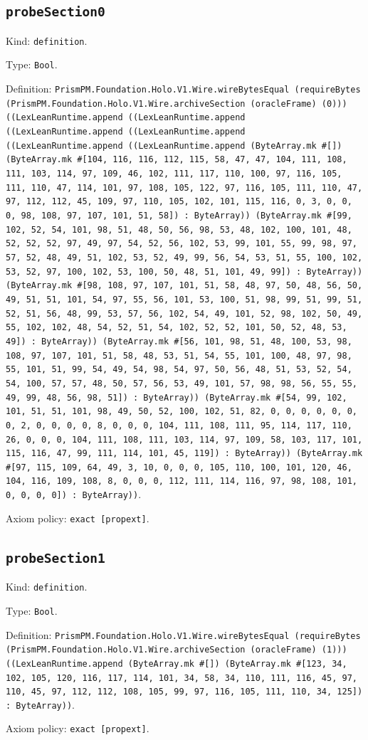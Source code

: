 \documentclass[11pt]{article}
\begin{document}
\subsection*{\texttt{probeSection0}}
\noindent Kind: \texttt{definition}.\par
\noindent Type: \texttt{Bool}.\par
\noindent Definition: \texttt{PrismPM.Foundation.Holo.V1.Wire.wireBytesEqual (requireBytes (PrismPM.Foundation.Holo.V1.Wire.archiveSection (oracleFrame) (0))) ((LexLeanRuntime.append ((LexLeanRuntime.append ((LexLeanRuntime.append ((LexLeanRuntime.append ((LexLeanRuntime.append ((LexLeanRuntime.append (ByteArray.mk \#[]) (ByteArray.mk \#[104, 116, 116, 112, 115, 58, 47, 47, 104, 111, 108, 111, 103, 114, 97, 109, 46, 102, 111, 117, 110, 100, 97, 116, 105, 111, 110, 47, 114, 101, 97, 108, 105, 122, 97, 116, 105, 111, 110, 47, 97, 112, 112, 45, 109, 97, 110, 105, 102, 101, 115, 116, 0, 3, 0, 0, 0, 98, 108, 97, 107, 101, 51, 58]) : ByteArray)) (ByteArray.mk \#[99, 102, 52, 54, 101, 98, 51, 48, 50, 56, 98, 53, 48, 102, 100, 101, 48, 52, 52, 52, 97, 49, 97, 54, 52, 56, 102, 53, 99, 101, 55, 99, 98, 97, 57, 52, 48, 49, 51, 102, 53, 52, 49, 99, 56, 54, 53, 51, 55, 100, 102, 53, 52, 97, 100, 102, 53, 100, 50, 48, 51, 101, 49, 99]) : ByteArray)) (ByteArray.mk \#[98, 108, 97, 107, 101, 51, 58, 48, 97, 50, 48, 56, 50, 49, 51, 51, 101, 54, 97, 55, 56, 101, 53, 100, 51, 98, 99, 51, 99, 51, 52, 51, 56, 48, 99, 53, 57, 56, 102, 54, 49, 101, 52, 98, 102, 50, 49, 55, 102, 102, 48, 54, 52, 51, 54, 102, 52, 52, 101, 50, 52, 48, 53, 49]) : ByteArray)) (ByteArray.mk \#[56, 101, 98, 51, 48, 100, 53, 98, 108, 97, 107, 101, 51, 58, 48, 53, 51, 54, 55, 101, 100, 48, 97, 98, 55, 101, 51, 99, 54, 49, 54, 98, 54, 97, 50, 56, 48, 51, 53, 52, 54, 54, 100, 57, 57, 48, 50, 57, 56, 53, 49, 101, 57, 98, 98, 56, 55, 55, 49, 99, 48, 56, 98, 51]) : ByteArray)) (ByteArray.mk \#[54, 99, 102, 101, 51, 51, 101, 98, 49, 50, 52, 100, 102, 51, 82, 0, 0, 0, 0, 0, 0, 0, 2, 0, 0, 0, 0, 8, 0, 0, 0, 104, 111, 108, 111, 95, 114, 117, 110, 26, 0, 0, 0, 104, 111, 108, 111, 103, 114, 97, 109, 58, 103, 117, 101, 115, 116, 47, 99, 111, 114, 101, 45, 119]) : ByteArray)) (ByteArray.mk \#[97, 115, 109, 64, 49, 3, 10, 0, 0, 0, 105, 110, 100, 101, 120, 46, 104, 116, 109, 108, 8, 0, 0, 0, 112, 111, 114, 116, 97, 98, 108, 101, 0, 0, 0, 0]) : ByteArray))}.\par
\noindent Axiom policy: \texttt{exact [propext]}.\par
\subsection*{\texttt{probeSection1}}
\noindent Kind: \texttt{definition}.\par
\noindent Type: \texttt{Bool}.\par
\noindent Definition: \texttt{PrismPM.Foundation.Holo.V1.Wire.wireBytesEqual (requireBytes (PrismPM.Foundation.Holo.V1.Wire.archiveSection (oracleFrame) (1))) ((LexLeanRuntime.append (ByteArray.mk \#[]) (ByteArray.mk \#[123, 34, 102, 105, 120, 116, 117, 114, 101, 34, 58, 34, 110, 111, 116, 45, 97, 110, 45, 97, 112, 112, 108, 105, 99, 97, 116, 105, 111, 110, 34, 125]) : ByteArray))}.\par
\noindent Axiom policy: \texttt{exact [propext]}.\par
\end{document}
